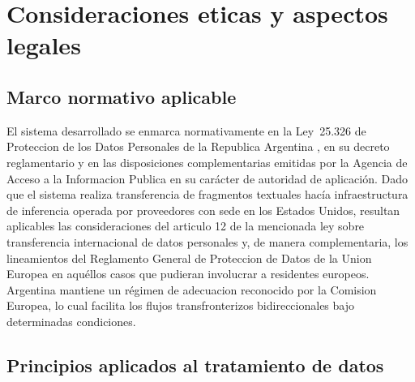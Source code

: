 \section{Consideraciones eticas y aspectos legales}

\subsection{Marco normativo aplicable}

El sistema desarrollado se enmarca normativamente en la Ley~25.326 de Proteccion de los Datos Personales de la Republica Argentina \parencite{Ley25326_2000}, en su decreto reglamentario y en las disposiciones complementarias emitidas por la Agencia de Acceso a la Informacion Publica en su carácter de autoridad de aplicación. Dado que el sistema realiza transferencia de fragmentos textuales hacía infraestructura de inferencia operada por proveedores con sede en los Estados Unidos, resultan aplicables las consideraciones del articulo 12 de la mencionada ley sobre transferencia internacional de datos personales y, de manera complementaria, los lineamientos del Reglamento General de Proteccion de Datos de la Union Europea \parencite{GDPR2016} en aquéllos casos que pudieran involucrar a residentes europeos. Argentina mantiene un régimen de adecuacion reconocido por la Comision Europea, lo cual facilita los flujos transfronterizos bidireccionales bajo determinadas condiciones.

\subsection{Principios aplicados al tratamiento de datos}

